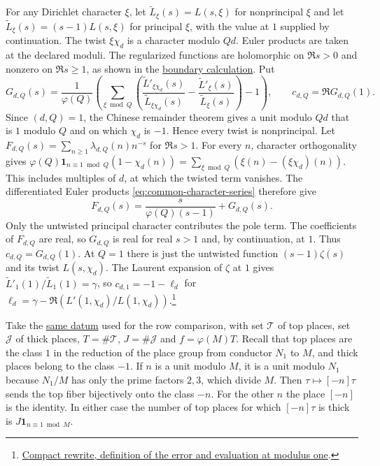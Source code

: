 For any Dirichlet character \(\xi\), let \(\widetilde L_\xi(s)=L(s,\xi)\) for
nonprincipal \(\xi\) and let \(\widetilde L_\xi(s)=(s-1)L(s,\xi)\) for
principal \(\xi\), with the value at \(1\) supplied by continuation. The
twist \(\xi\chi_d\) is a character modulo \(Qd\). Euler products are taken
at the declared moduli. The regularized functions are holomorphic on
\(\Re s>0\) and nonzero on \(\Re s\ge1\), as shown in the
\hyperlink{proof.dirichlet-zero-free-line}{boundary calculation}.
Put
\begin{equation}\label{eq:weighted-centered-log-derivative}
 G_{d,Q}(s)=\frac{1}{\varphi(Q)}
 \left(\sum_{\xi\bmod Q}\left(
 \frac{\widetilde L'_{\xi\chi_d}(s)}{\widetilde L_{\xi\chi_d}(s)}
 -\frac{\widetilde L'_\xi(s)}{\widetilde L_\xi(s)}\right)-1\right),
 \qquad c_{d,Q}=\Re G_{d,Q}(1).
\end{equation}
Since \((d,Q)=1\), the Chinese remainder theorem gives a unit modulo
\(Qd\) that is \(1\) modulo \(Q\) and on which \(\chi_d\) is \(-1\).
Hence every twist is nonprincipal. Let
\(F_{d,Q}(s)=\sum_{n\ge1}\lambda_{d,Q}(n)n^{-s}\) for \(\Re s>1\).
For every \(n\), character orthogonality gives
\(\varphi(Q)\mathbf 1_{n\equiv1\bmod Q}(1-\chi_d(n))
=\sum_{\xi\bmod Q}(\xi(n)-(\xi\chi_d)(n))\).
This includes multiples of \(d\), at which the twisted term vanishes.
The differentiated Euler products \eqref{eq:common-character-series}
therefore give
\begin{equation}\label{eq:weighted-series}
 F_{d,Q}(s)=\frac{s}{\varphi(Q)(s-1)}+G_{d,Q}(s).
\end{equation}
Only the untwisted principal character contributes the pole term.
The coefficients of \(F_{d,Q}\) are real, so \(G_{d,Q}\) is real for
real \(s>1\) and, by continuation, at \(1\). Thus \(c_{d,Q}=G_{d,Q}(1)\).
At \(Q=1\) there is just the untwisted function \((s-1)\zeta(s)\) and
its twist \(L(s,\chi_d)\). The Laurent expansion of \(\zeta\) at \(1\) gives
\(\widetilde L'_1(1)/\widetilde L_1(1)=\gamma\), so
\(c_{d,1}=-1-\ell_d\) for
\(\ell_d=\gamma-\Re(L'(1,\chi_d)/L(1,\chi_d))\).\footnote{\href{https://github.com/lsernau/grh-lean/blob/72fead102f663d5c7a407964a13dc0cf9d977207/grh-compact/src/New/Endgame/PrimeError.lean\#L23-L65}{Compact rewrite, definition of the error and evaluation at modulus one}.}

%
Take the \hyperlink{proof.weighted-data}{same datum} used for the row
comparison, with set \(\mathcal T\) of top places, set \(\mathcal J\) of
thick places, \(T=\#\mathcal T\), \(J=\#\mathcal J\) and
\(f=\varphi(M)T\). Recall that top places are the class \(1\) in the
reduction of the place group from conductor \(N_1\) to \(M\), and thick
places belong to the class \(-1\). If \(n\) is a unit modulo \(M\), it is a
unit modulo \(N_1\) because \(N_1/M\) has only the prime factors \(2,3\),
which divide \(M\). Then \(\tau\mapsto[-n]\tau\) sends the top fiber
bijectively onto the class \(-n\). For the other \(n\) the place \([-n]\)
is the identity. In either case the number of top places for which
\([-n]\tau\) is thick is \(J\mathbf{1}_{n\equiv1\bmod M}\).

